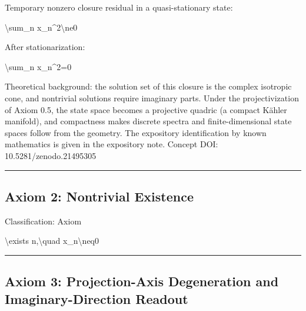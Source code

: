 \documentclass[
  a4paper,
]{article}
\newenvironment{Shaded}{}{}
\newcommand{\NormalTok}[1]{#1}
\begin{document}
Temporary nonzero closure residual in a quasi-stationary state:

\begin{Shaded}
\begin{Highlighting}[]
\NormalTok{\textbackslash{}sum\_n x\_n\^{}2\textbackslash{}ne0}
\end{Highlighting}
\end{Shaded}

After stationarization:

\begin{Shaded}
\begin{Highlighting}[]
\NormalTok{\textbackslash{}sum\_n x\_n\^{}2=0}
\end{Highlighting}
\end{Shaded}

Theoretical background: the solution set of this closure is the complex
isotropic cone, and nontrivial solutions require imaginary parts. Under
the projectivization of Axiom 0.5, the state space becomes a projective
quadric (a compact Kähler manifold), and compactness makes discrete
spectra and finite-dimensional state spaces follow from the geometry.
The expository identification by known mathematics is given in the
expository note. Concept DOI: 10.5281/zenodo.21495305

\begin{center}\rule{0.5\linewidth}{0.5pt}\end{center}

\subsection{Axiom 2: Nontrivial
Existence}\label{axiom-2-nontrivial-existence}

Classification: Axiom

\begin{Shaded}
\begin{Highlighting}[]
\NormalTok{\textbackslash{}exists n,\textbackslash{}quad x\_n\textbackslash{}neq0}
\end{Highlighting}
\end{Shaded}

\begin{center}\rule{0.5\linewidth}{0.5pt}\end{center}

\subsection{Axiom 3: Projection-Axis Degeneration and
Imaginary-Direction
Readout}\label{axiom-3-projection-axis-degeneration-and-imaginary-direction-readout}
\end{document}
